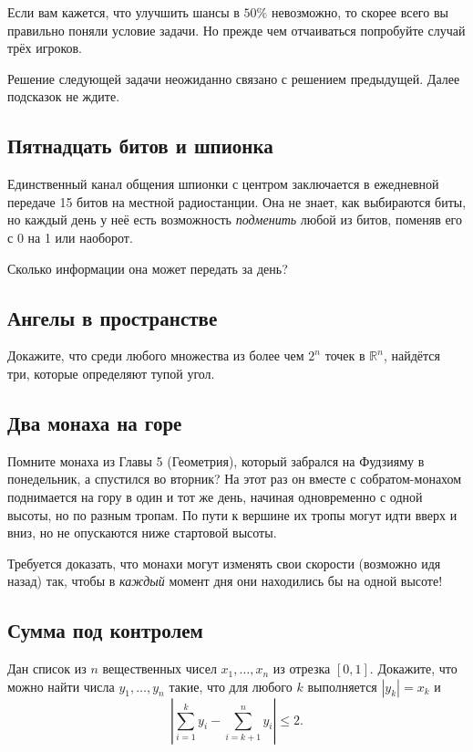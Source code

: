 Если вам кажется, что улучшить шансы в $50\%$ невозможно, то скорее всего вы правильно поняли условие задачи.
Но прежде чем отчаиваться попробуйте случай трёх игроков.

\medskip 

Решение следующей задачи неожиданно связано с решением предыдущей.
Далее подсказок не ждите.

\subsection*{Пятнадцать битов и шпионка}

Единственный канал общения шпионки с центром заключается в ежедневной передаче 15 битов на местной радиостанции.
Она не знает, как выбираются биты, но каждый день у неё есть возможность \emph{подменить} любой из битов, поменяв его с 0 на 1 или наоборот.

Сколько информации она может передать за день?

\subsection*{Ангелы в пространстве}

Докажите, что среди любого множества из более чем $2^n$ точек в $\mathbb{R}^n$, найдётся три, которые определяют тупой угол.

\subsection*{Два монаха на горе}

Помните монаха из Главы 5 (Геометрия), который забрался на Фудзияму в понедельник, а спустился во вторник?
На этот раз он вместе с собратом-монахом поднимается на гору в один и тот же день, начиная одновременно с одной высоты, но по разным тропам.
По пути к вершине их тропы могут идти вверх и вниз, но не опускаются ниже стартовой высоты.

Требуется доказать, что монахи могут изменять свои скорости (возможно идя назад) так, чтобы в \emph{каждый} момент дня они находились бы на одной высоте!

\subsection*{Сумма под контролем}

Дан список из $n$ вещественных чисел $x_1,\dots,x_n$ из отрезка $[0,1]$.
Докажите, что можно найти числа $y_1,\dots,y_n$ такие, что для любого $k$ выполняется $|y_k|=x_k$ и
\[\left|\sum_{i=1}^ky_i-\sum_{i=k+1}^ny_i\right|\le 2.\]

